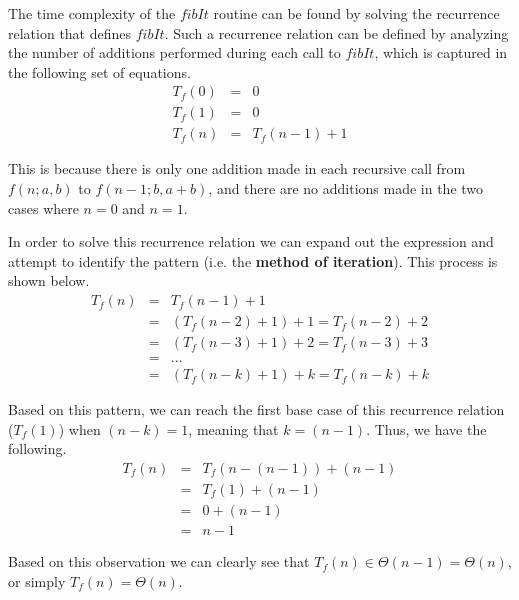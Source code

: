 \documentclass[11pt]{article}
\begin{document}
\begin{prob}{2}
\end{prob}
\begin{sol}

The time complexity of the $fibIt$ routine can be found by solving the recurrence relation that defines $fibIt$. Such a recurrence relation can be defined by analyzing the number of additions performed during each call to $fibIt$, which is captured in the following set of equations.
\begin{eqnarray*}
T_{f}(0) & = & 0 \\
T_{f}(1) & = & 0 \\
T_{f}(n) & = & T_{f}(n-1) + 1
\end{eqnarray*}

This is because there is only one addition made in each recursive call from $f(n;a,b)$ to $f(n-1;b,a+b)$, and there are no additions made in the two cases where $n = 0$ and $n = 1$.

In order to solve this recurrence relation we can expand out the expression and attempt to identify the pattern (i.e. the \textbf{method of iteration}). This process is shown below.
\begin{eqnarray*}
T_{f}(n) & = & T_{f}(n - 1) + 1 \\
& = & (T_{f}(n - 2) + 1) + 1 = T_{f}(n - 2) + 2 \\
& = & (T_{f}(n - 3) + 1) + 2 = T_{f}(n - 3) + 3 \\
& = & ... \\
& = & (T_{f}(n - k) + 1) + k = T_{f}(n - k) + k
\end{eqnarray*}

Based on this pattern, we can reach the first base case of this recurrence relation ($T_{f}(1)$) when $(n - k) = 1$, meaning that $k = (n - 1)$. Thus, we have the following.
\begin{eqnarray*}
T_{f}(n) & = & T_{f}(n - (n - 1)) + (n - 1)  \\
& = & T_{f}(1) + (n - 1) \\
& = & 0 + (n - 1) \\
& = & n - 1
\end{eqnarray*}

Based on this observation we can clearly see that $T_{f}(n) \in \Theta(n - 1) = \Theta(n)$, or simply $T_{f}(n) = \Theta(n)$. 




\end{sol}
\end{document}
